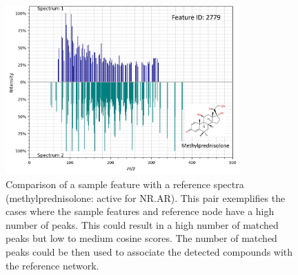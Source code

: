 \begin{figure}[h]
  \centering
  \includegraphics[width=0.8\textwidth]{include/img/appendix/sample/spectra_sample_steroid.png}
  \caption{Comparison of a sample feature with a reference spectra (methylprednisolone: active for NR.AR). This pair exemplifies the cases where the sample features and reference node have a high number of peaks. This could result in a high number of matched peaks but low to medium cosine scores. The number of matched peaks could be then used to associate the detected compounds with the reference network.}
  \label{fig:spectra_sample_steroid}
\end{figure}






